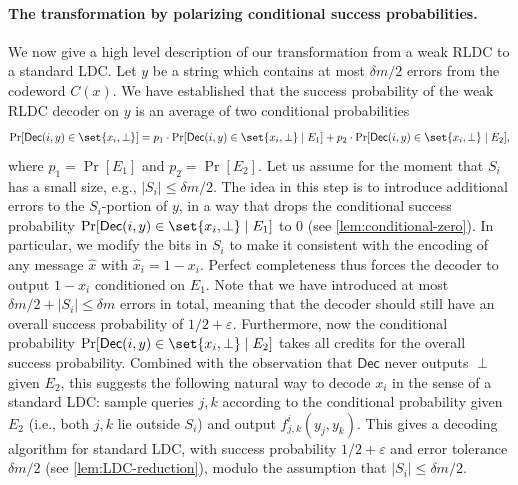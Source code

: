 \documentclass[10pt,a4paper]{article}
\theoremstyle{remark}
\newcommand{\eps}{\ensuremath{\varepsilon}}
\newcommand{\Dec}{\ensuremath{\mathsf{Dec}}\xspace}
\begin{document}
\paragraph{The transformation by polarizing conditional success probabilities.} We now give a high level description of our transformation from a weak RLDC to a standard LDC. Let $y$ be a string which contains at most $\delta m/2$ errors from the codeword $C(x)$. We have established that the success probability of the weak RLDC decoder on $y$ is an average of two conditional probabilities
\begin{align*}
	\Pr[\Dec(i,y) \in \set{x_i, \perp}] = p_1 \cdot \Pr[\Dec(i,y) \in \set{x_i, \perp} \mid E_1] + p_2 \cdot \Pr[\Dec(i,y) \in \set{x_i, \perp} \mid E_2],
\end{align*}
where $p_1 = \Pr[E_1]$ and $p_2 = \Pr[E_2]$. Let us assume for the moment that $S_i$ has a small size, e.g., $|S_i|\le \delta m/2$. The idea in this step is to introduce additional errors to the $S_i$-portion of $y$, in a way that drops the conditional success probability $\Pr[\Dec(i,y) \in \set{x_i, \perp} \mid E_1]$ to 0 (see \cref{lem:conditional-zero}). In particular, we modify the bits in $S_i$ to make it consistent with the encoding of any message $\hat{x}$ with $\hat{x}_i=1-x_i$. Perfect completeness thus forces the decoder to output $1-x_i$ conditioned on $E_1$. Note that we have introduced at most $\delta m/2 + |S_i| \le \delta m$ errors in total, meaning that the decoder should still have an overall success probability of $1/2+\eps$. Furthermore, now the conditional probability $\Pr[\Dec(i,y) \in \set{x_i, \perp} \mid E_2]$ takes all credits for the overall success probability. Combined with the observation that $\Dec$ never outputs $\perp$ given $E_2$, this suggests the following natural way to decode $x_i$ in the sense of a standard LDC: sample queries $j, k$ according to the conditional probability given $E_2$ (i.e., both $j,k$ lie outside $S_i$) and output $f_{j,k}^{i}(y_j, y_k)$. This gives a decoding algorithm for standard LDC, with success probability $1/2+\eps$ and error tolerance $\delta m/2$ (see \cref{lem:LDC-reduction}), modulo the assumption that $|S_i|\le \delta m/2$.
\end{document}
